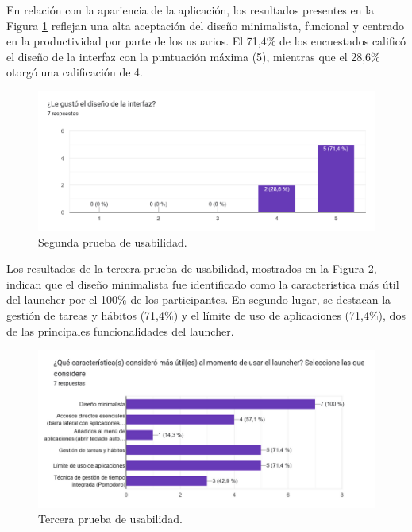 En relación con la apariencia de la aplicación, los resultados presentes en la Figura \ref{fig:interfaz_agradable} reflejan una alta aceptación del diseño minimalista, funcional y centrado en la productividad por parte de los usuarios. El 71,4\% de los encuestados calificó el diseño de la interfaz con la puntuación máxima (5), mientras que el 28,6\% otorgó una calificación de 4.

\begin{figure}[h]
  \caption{Segunda prueba de usabilidad.}
  \label{fig:interfaz_agradable}
  \includegraphics[width=\textwidth]{Figuras/interfaz_agradable.png}
  \centering
\end{figure}

Los resultados de la tercera prueba de usabilidad, mostrados en la Figura \ref{fig:mejores_caracteristicas}, indican que el diseño minimalista fue identificado como la característica más útil del launcher por el 100\% de los participantes. En segundo lugar, se destacan la gestión de tareas y hábitos (71,4\%) y el límite de uso de aplicaciones (71,4\%), dos de las principales funcionalidades del launcher. 

\begin{figure}[h]
  \caption{Tercera prueba de usabilidad.}
  \label{fig:mejores_caracteristicas}
  \includegraphics[width=\textwidth]{Figuras/mejores_caracteristicas.png}
  \centering
\end{figure}